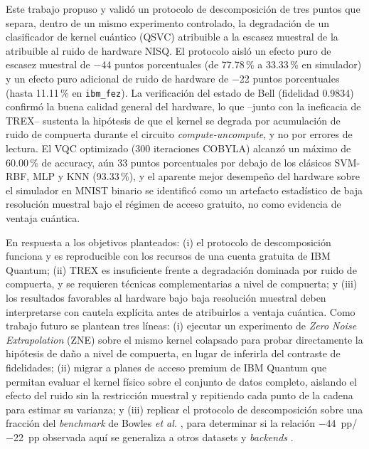 \documentclass[conference]{IEEEtran}
\begin{document}
Este trabajo propuso y validó un protocolo de descomposición de tres puntos que separa, dentro de un mismo experimento controlado, la degradación de un clasificador de kernel cuántico (QSVC) atribuible a la escasez muestral de la atribuible al ruido de hardware NISQ. El protocolo aisló un efecto puro de escasez muestral de $-$44 puntos porcentuales (de 77.78\,\% a 33.33\,\% en simulador) y un efecto puro adicional de ruido de hardware de $-$22 puntos porcentuales (hasta 11.11\,\% en \texttt{ibm\_fez}). La verificación del estado de Bell (fidelidad 0.9834) confirmó la buena calidad general del hardware, lo que --junto con la ineficacia de TREX-- sustenta la hipótesis de que el kernel se degrada por acumulación de ruido de compuerta durante el circuito \textit{compute-uncompute}, y no por errores de lectura. El VQC optimizado (300 iteraciones COBYLA) alcanzó un máximo de 60.00\,\% de accuracy, aún 33 puntos porcentuales por debajo de los clásicos SVM-RBF, MLP y KNN (93.33\,\%), y el aparente mejor desempeño del hardware sobre el simulador en MNIST binario se identificó como un artefacto estadístico de baja resolución muestral bajo el régimen de acceso gratuito, no como evidencia de ventaja cuántica.

En respuesta a los objetivos planteados: (i) el protocolo de descomposición funciona y es reproducible con los recursos de una cuenta gratuita de IBM Quantum; (ii) TREX es insuficiente frente a degradación dominada por ruido de compuerta, y se requieren técnicas complementarias a nivel de compuerta; y (iii) los resultados favorables al hardware bajo baja resolución muestral deben interpretarse con cautela explícita antes de atribuirlos a ventaja cuántica. Como trabajo futuro se plantean tres líneas: (i) ejecutar un experimento de \textit{Zero Noise Extrapolation} (ZNE) \cite{temme2017} sobre el mismo kernel colapsado para probar directamente la hipótesis de daño a nivel de compuerta, en lugar de inferirla del contraste de fidelidades; (ii) migrar a planes de acceso premium de IBM Quantum que permitan evaluar el kernel físico sobre el conjunto de datos completo, aislando el efecto del ruido sin la restricción muestral y repitiendo cada punto de la cadena para estimar su varianza; y (iii) replicar el protocolo de descomposición sobre una fracción del \textit{benchmark} de Bowles \textit{et al.} \cite{bowles2024}, para determinar si la relación $-$44~pp/$-$22~pp observada aquí se generaliza a otros datasets y \textit{backends} \cite{huang2021,biamonte2017}.



\end{document}
